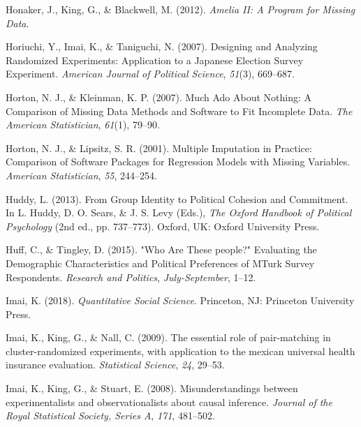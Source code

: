 \documentclass[12pt,econ]{sources/authesis}
\newenvironment{CSLReferences}%
  {}%
  {\par}
\begin{document}
\begin{CSLReferences}{1}{0}
\leavevmode{}%
Honaker, J., King, G., \& Blackwell, M. (2012). \emph{{Amelia II: A Program for Missing Data}}.

\leavevmode{}%
Horiuchi, Y., Imai, K., \& Taniguchi, N. (2007). {Designing and Analyzing Randomized Experiments: Application to a Japanese Election Survey Experiment}. \emph{American Journal of Political Science}, \emph{51}(3), 669--687.

\leavevmode{}%
Horton, N. J., \& Kleinman, K. P. (2007). {Much Ado About Nothing: A Comparison of Missing Data Methods and Software to Fit Incomplete Data}. \emph{The American Statistician}, \emph{61}(1), 79--90.

\leavevmode{}%
Horton, N. J., \& Lipsitz, S. R. (2001). {Multiple Imputation in Practice: Comparison of Software Packages for Regression Models with Missing Variables}. \emph{American Statistician}, \emph{55}, 244--254.

\leavevmode{}%
Huddy, L. (2013). {From Group Identity to Political Cohesion and Commitment}. In L. Huddy, D. O. Sears, \& J. S. Levy (Eds.), \emph{{The Oxford Handbook of Political Psychology}} (2nd ed., pp. 737--773). Oxford, UK: Oxford University Press.

\leavevmode{}%
Huff, C., \& Tingley, D. (2015). "{Who} {Are} {These} people?" {Evaluating} the {Demographic} {Characteristics} and {Political} {Preferences} of {MTurk} {Survey} {Respondents}. \emph{Research and Politics}, \emph{July-September}, 1--12.

\leavevmode{}%
Imai, K. (2018). \emph{Quantitative {Social} {Science}}. Princeton, NJ: Princeton University Press.

\leavevmode{}%
Imai, K., King, G., \& Nall, C. (2009). The essential role of pair-matching in cluster-randomized experiments, with application to the mexican universal health insurance evaluation. \emph{Statistical Science}, \emph{24}, 29--53.

\leavevmode{}%
Imai, K., King, G., \& Stuart, E. (2008). Misunderstandings between experimentalists and observationalists about causal inference. \emph{Journal of the Royal Statistical Society, Series A}, \emph{171}, 481--502.


\end{CSLReferences}
\end{document}
